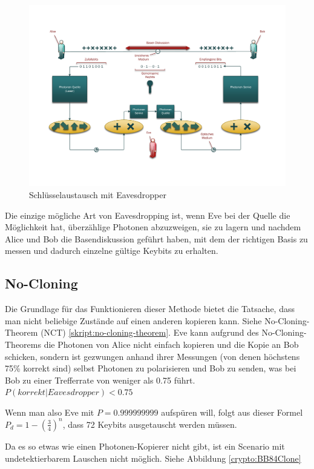   \begin{figure}
    \centering
    \includegraphics[height=0.45\textheight]{crypto/BB84Eve.pdf}
    \caption{Schl\"usselaustausch mit Eavesdropper\label{crypto:BB84Eve}}
  \end{figure}

  Die einzige m\"ogliche Art von Eavesdropping ist, wenn Eve bei der Quelle die M\"oglichkeit hat, \"uberz\"ahlige Photonen abzuzweigen,
  sie zu lagern und nachdem Alice und Bob die Basendiskussion gef\"uhrt haben,
  mit dem der richtigen Basis zu messen und dadurch einzelne g\"ultige Keybits zu erhalten.

  \subsection{No-Cloning}
  Die Grundlage f\"ur das Funktionieren dieser Methode bietet die Tatsache, dass man nicht beliebige Zust\"ande auf einen anderen kopieren kann. Siehe No-Cloning-Theorem (NCT) \ref{skript:no-cloning-theorem}.
  Eve kann aufgrund des No-Cloning-Theorems die Photonen von Alice nicht einfach kopieren und die Kopie an Bob schicken,
  sondern ist gezwungen anhand ihrer Messungen (von denen h\"ochstens 75\% korrekt sind) selbst Photonen zu polarisieren
  und Bob zu senden, was bei Bob zu einer Trefferrate von weniger als 0.75 f\"uhrt.
  $P(korrekt|Eavesdropper)<0.75$

  Wenn man also Eve mit $P=0.999999999$ aufsp\"uren will,
  folgt aus dieser Formel $P_d = 1 - \left(\frac{3}{4}\right)^n$,
  dass 72 Keybits ausgetauscht werden m\"ussen.

  Da es so etwas wie einen Photonen-Kopierer nicht gibt, ist ein Scenario mit undetektierbarem Lauschen nicht m\"oglich. Siehe Abbildung \ref{crypto:BB84Clone}


